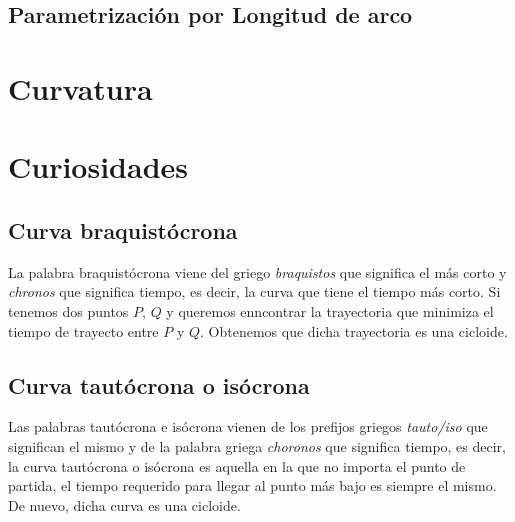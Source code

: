 \documentclass{article}
\begin{document}
\subsection{Parametrización por Longitud de arco}

\section{Curvatura}

\section{Curiosidades}
\subsection{Curva braquistócrona}
La palabra braquistócrona viene del griego \textit{braquistos} que significa el más corto y \textit{chronos} que significa tiempo, es decir, la curva que tiene el tiempo más corto. Si tenemos dos puntos $ P $, $ Q $ y queremos enncontrar la trayectoria que minimiza el tiempo de trayecto entre $ P $ y $ Q $. Obtenemos que dicha trayectoria es una cicloide.
\subsection{Curva tautócrona o isócrona}
Las palabras tautócrona e isócrona vienen de los prefijos griegos \textit{tauto/iso} que significan el mismo y de la palabra griega \textit{choronos} que significa tiempo, es decir, la curva tautócrona o isócrona es aquella en la que no importa el punto de partida, el tiempo requerido para llegar al punto más bajo es siempre el mismo. De nuevo, dicha curva es una cicloide.
\end{document}
